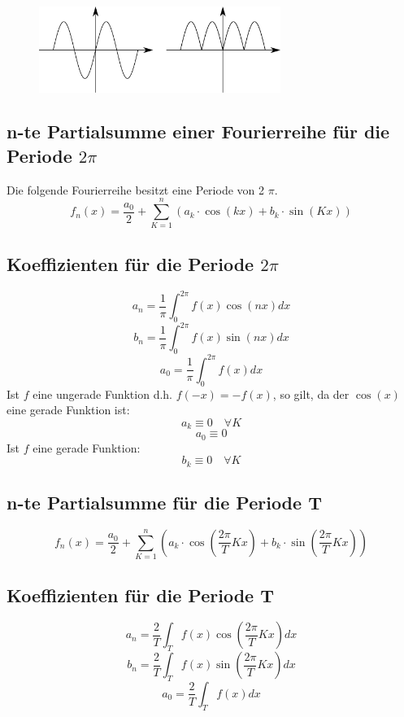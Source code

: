 \begin{figure}[h!]
\centering
\includegraphics[width=0.7\textwidth]{geradeungerade.pdf}
\end{figure}

\subsection{n-te Partialsumme einer Fourierreihe für die Periode $2\pi$}
Die folgende Fourierreihe besitzt eine Periode von 2 $\pi$. 
\[ \boxed{f_n(x) = \frac{a_0}{2} + \sum_{K=1}^n \left(a_k \cdot \cos(kx) + b_k \cdot \sin(Kx)\right)} \]

\subsection{Koeffizienten für die Periode $2\pi$}
\[ \boxed{a_n = \frac{1}{\pi} \int_0^{2 \pi} f(x) \cos(nx) dx} \]
\[ \boxed{b_n = \frac{1}{\pi} \int_0^{2 \pi} f(x) \sin(nx) dx} \]
\[ \boxed{a_0 = \frac{1}{\pi} \int_0^{2 \pi} f(x) dx
} \]
Ist $f$ eine ungerade Funktion d.h. $f(-x) = -f(x)$, so gilt, da der $\cos(x)$ eine gerade Funktion ist: 
\[ a_k \equiv 0 \quad \forall K\]
\[ a_0 \equiv 0 \]
Ist $f$ eine gerade Funktion: 
\[ b_k \equiv 0 \quad \forall K \]

\subsection{n-te Partialsumme für die Periode T}
\[ \boxed{f_n(x) = \frac{a_0}{2} + \sum_{K=1}^n \left(a_k \cdot \cos \left(\frac{2 \pi}{T} K x\right) + b_k \cdot \sin\left(\frac{2 \pi}{T} K x\right)\right)} \]

\subsection{Koeffizienten für die Periode T}
\[ \boxed{a_n = \frac{2}{T} \int_T f(x) \cos(\frac{2 \pi}{T} K x) dx} \]
\[ \boxed{b_n = \frac{2}{T} \int_T f(x) \sin(\frac{2 \pi}{T} K x) dx} \]
\[ \boxed{a_0 = \frac{2}{T} \int_T f(x) dx
} \]

